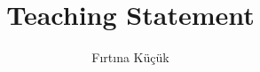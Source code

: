 \documentclass{article}
\title{Teaching Statement}
\author{Fırtına Küçük}
\date{}
\begin{document}
\maketitle

\newtheorem{lemma}{Lemma}[section]
\newtheorem{theorem}[lemma]{Theorem}
\newtheorem{prop}[lemma]{Proposition}
\newtheorem{cor}[lemma]{Corollary}
\newtheorem{conj}[lemma]{Conjecture}
\newtheorem{claim}[lemma]{Claim}
\newtheorem{definition}[lemma]{Definition}
\newtheorem{remark}[lemma]{Remark}


\newcommand{\mylabel}[2]{#2\def\@currentlabel{#2}\label{#1}}






\newcommand{\idele}{id{\'e}le}

\newcommand{\ccS}{\mathcal{S}}
\newcommand{\ccF}{\mathcal{F}}
\newcommand{\ccA}{\mathcal{A}}
\newcommand{\ccG}{\mathcal{G}}
\newcommand{\ccP}{\mathcal{P}}
\newcommand{\ccB}{\mathcal{B}}
\newcommand{\ccC}{\mathcal{C}}
\newcommand{\ccD}{\mathcal{D}}
\newcommand{\ccE}{\mathcal{E}}
\newcommand{\ccK}{\mathcal{K}}
\newcommand{\ccU}{\mathcal{U}}
\newcommand{\ccV}{\mathcal{V}}
\newcommand{\ccO}{\mathcal{O}}
\newcommand{\ccL}{\mathcal{L}}
\newcommand{\ccW}{\mathcal{W}}
\newcommand{\ccN}{\mathcal{N}}
\newcommand{\ccH}{\mathcal{H}}



\newcommand{\bbA}{{\mathbb A}}
\newcommand{\bbG}{{\mathbb G}}
\newcommand{\bbH}{{\mathbb H}}
\newcommand{\bbP}{{\mathbb P}}
\newcommand{\bbC}{{\mathbb C}}
\newcommand{\bbF}{{\mathbb F}}
\newcommand{\bbK}{{\mathbb K}}
\newcommand{\bbL}{{\mathbb L}}
\newcommand{\bbQ}{{\mathbb Q}}
\newcommand{\bbR}{{\mathbb R}}
\newcommand{\bbZ}{{\mathbb Z}}
\newcommand{\bbN}{{\mathbb N}}
\newcommand{\bbT}{{\mathbb T}}
\newcommand{\bbX}{{\mathbb X}}

\newcommand{\bbAt}{{\mathbb A}^{\times}}
\newcommand{\bbGt}{{\mathbb G}^{\times}}
\newcommand{\bbHt}{{\mathbb H}^{\times}}
\newcommand{\bbPt}{{\mathbb P}^{\times}}
\newcommand{\bbCt}{{\mathbb C}^{\times}}
\newcommand{\bbFt}{{\mathbb F}^{\times}}
\newcommand{\bbKt}{{\mathbb K}^{\times}}
\newcommand{\bbLt}{{\mathbb L}^{\times}}
\newcommand{\bbQt}{{\mathbb Q}^{\times}}
\newcommand{\bbRt}{{\mathbb R}^{\times}}
\newcommand{\bbZt}{{\mathbb Z}^{\times}}
\newcommand{\bbNt}{{\mathbb N}^{\times}}
\newcommand{\bbTt}{{\mathbb T}^{\times}}

\newcommand{\fraa}{{\mathfrak a}}
\newcommand{\frab}{{\mathfrak b}}
\newcommand{\frakc}{{\mathfrak c}}
\newcommand{\frad}{{\mathfrak d}}
\newcommand{\frae}{{\mathfrak e}}
\newcommand{\fraf}{{\mathfrak f}}
\newcommand{\frag}{{\mathfrak g}}
\newcommand{\frah}{{\mathfrak h}}
\newcommand{\frai}{{\mathfrak i}}
\newcommand{\fraj}{{\mathfrak j}}
\newcommand{\frk}{{\mathfrak k}}
\newcommand{\fral}{{\mathfrak l}}
\newcommand{\fram}{{\mathfrak m}}
\newcommand{\fran}{{\mathfrak n}}
\newcommand{\frao}{{\mathfrak o}}
\newcommand{\frap}{{\mathfrak p}}
\newcommand{\fraq}{{\mathfrak q}}
\newcommand{\frar}{{\mathfrak r}}
\newcommand{\fras}{{\mathfrak s}}
\newcommand{\frat}{{\mathfrak t}}
\newcommand{\frau}{{\mathfrak u}}
\newcommand{\frav}{{\mathfrak v}}
\newcommand{\fraw}{{\mathfrak w}}
\newcommand{\frax}{{\mathfrak x}}
\newcommand{\fray}{{\mathfrak y}}
\newcommand{\fraz}{{\mathfrak z}}
\end{document}
